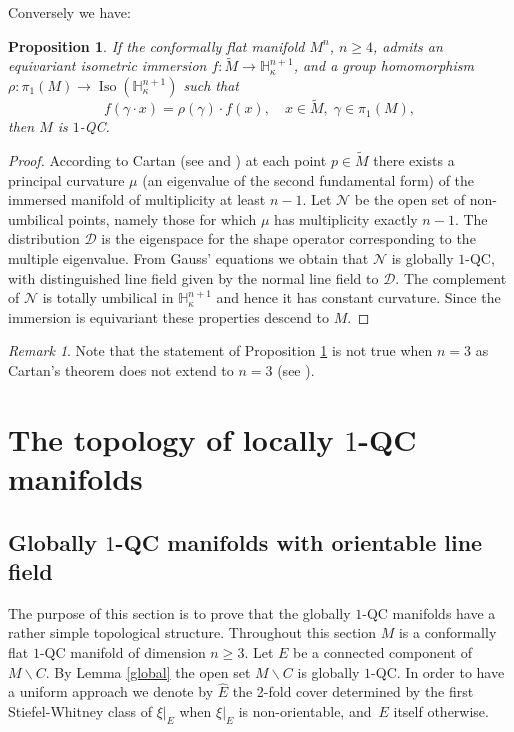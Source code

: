 \documentclass[10pt]{amsart}
\let\mathcal\mathscr
\let\moins\smallsetminus
\DeclareMathOperator{\Iso}{Iso}
\newtheorem{proposition}[theorem]{Proposition}
\theoremstyle{definition}
\theoremstyle{remark}
\newtheorem{remark}[theorem]{Remark}
\numberwithin{equation}{section}
\begin{document}
Conversely we have:
\begin{proposition}\label{characterize}
If the conformally flat manifold $M^n$, $n\geq4$, admits an equivariant isometric immersion
$f:\widetilde{M}\to \mathbb H_{\kappa}^{n+1}$, and
a group homomorphism $\rho:\pi_1(M)\to \Iso(\mathbb H_{\kappa}^{n+1})$ such that
\[ f(\gamma\cdot x)=\rho(\gamma)\cdot f(x),\quad x\in \widetilde{M},\; \gamma \in \pi_1(M),\]
then $M$ is $1$-QC.
\end{proposition}
\begin{proof}
According to Cartan
(see \cite{Ca} and \cite[Th.\,4]{La}) at each point $p\in \widetilde{M}$ there exists
a principal curvature $\mu$ (\ie an eigenvalue of the second fundamental form) of the immersed
manifold of multiplicity at least $n-1$.
Let $\mathcal N$ be the open set of non-umbilical points,
namely those for which $\mu$ has multiplicity exactly $n-1$. The distribution $\mathcal D$ is the eigenspace for the
shape operator corresponding to the multiple eigenvalue.
From Gauss' equations we obtain that $\mathcal N$ is globally $1$-QC, with distinguished line field given by the
normal line field to $\mathcal D$. The complement of $\mathcal N$ is totally umbilical in
$\mathbb H_{\kappa}^{n+1}$ and hence it has constant curvature. Since the immersion is equivariant
these properties descend to $M$.
\end{proof}
\begin{remark}
Note that the statement of Proposition \ref{characterize} is not true when $n=3$
as Cartan's theorem does not extend to $n=3$ (see \cite{La}).
\end{remark}

\section{The topology of locally \texorpdfstring{$1$}{1}-QC manifolds}\label{sec:3}
\subsection{Globally $1$-QC manifolds with orientable line field}
The purpose of this section is to prove that
the globally $1$-QC manifolds have a rather simple topological structure.
Throughout this section $M$ is a conformally flat $1$-QC manifold of dimension $n\geq3$.
Let $E$ be a connected component of $M\moins C$.
By Lemma \ref{global} the open set $M\moins C$ is globally $1$-QC.
In order to have a uniform approach we denote by $\widehat{E}$ the
2-fold cover determined by the first Stiefel-Whitney class of $\xi|_{E}$
when $\xi|_E$ is non-orientable, and~$E$ itself otherwise.
\end{document}
